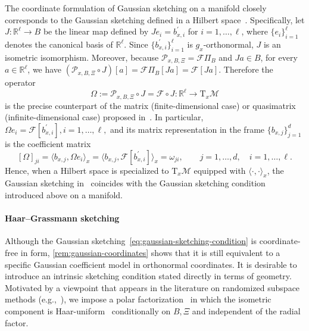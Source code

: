 \documentclass[final,onefignum,onetabnum]{siamart250211}
\begin{document}
\begin{remark}
\label{rem:gaussian-coordinates}
The coordinate formulation of Gaussian sketching on a manifold closely corresponds to the Gaussian sketching defined in a Hilbert space~\cite{PerssonBoulleKressner2024}. Specifically,
let
  $
J:\mathbb R^{\ell}\to B$ be the linear map defined by $J e_i=b^\prime_{x,i}$ for $i=1,\dots,\ell$, where $\{e_i\}_{i=1}^{\ell}$ denotes the canonical basis of $\mathbb R^{\ell}$. Since $\{b^\prime_{x,i}\}_{i=1}^{\ell}$ is $g_x$-orthonormal, $J$ is an isometric isomorphism. Moreover, because $\mathcal P_{x,B,\Xi}=\mathcal F\Pi_B$ and $J a\in B$,  for every $a\in\mathbb R^{\ell}$, we have
$
(\mathcal P_{x,B,\Xi}\circ J)[a]
=
\mathcal F\Pi_B[J a]
=
\mathcal F[J a].
$
Therefore the operator
\[
\Omega:=\mathcal P_{x,B,\Xi}\circ J=\mathcal F\circ J:
\mathbb R^{\ell}\to \mathrm T_x\mathcal M
\]
is the precise counterpart of the matrix (finite-dimensional case) or quasimatrix (infinite-dimensional case)
proposed in~\cite{PerssonBoulleKressner2024}.
In particular,
$
\Omega e_i
=
\mathcal F[b^\prime_{x,i}], i=1,\dots,\ell,
$
and its matrix representation in the frame $\{b_{x,j}\}_{j=1}^d$ is the coefficient matrix
\[
[\Omega]_{ji}
=
\langle b_{x,j},\Omega e_i\rangle_x
=
\langle b_{x,j},\mathcal F[b^\prime_{x,i}]\rangle_x
=
\omega_{ji},
\qquad j=1,\dots,d,\quad i=1,\dots,\ell.
\]
Hence, when a Hilbert space is specialized to $\mathrm T_x\mathcal M$ equipped with $\langle\cdot,\cdot\rangle_x$, the Gaussian sketching in~\cite{PerssonBoulleKressner2024} coincides with the Gaussian sketching condition introduced above on a manifold.
\end{remark}

\paragraph{Haar–Grassmann sketching} Although the Gaussian sketching~\cref{eq:gaussian-sketching-condition} is coordinate-free in form, \cref{rem:gaussian-coordinates} shows that it is still equivalent to a specific Gaussian coefficient model in orthonormal coordinates.
It is desirable to introduce an intrinsic sketching condition stated directly in terms of geometry.
Motivated by a viewpoint that appears in the literature on randomized subspace methods (e.g.,~\cite{halko2011finding}), 
we impose a polar factorization~\cite{higham2008functions} in which the isometric component is Haar-uniform~\cite{chikuse2003special} conditionally on $B, \Xi$ and independent of the radial factor.
\end{document}
